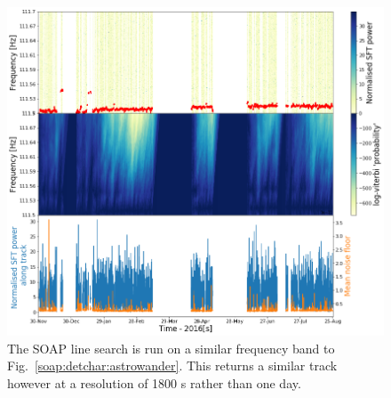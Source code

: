 %
\begin{figure}
	\centering
	\includegraphics[width=\textwidth]{C5_detchar/track_F111_5_111_7_wander_2.png}
	\caption[Example SOAP output for wandering line]{The SOAP line search is run on a similar frequency band to Fig.~\ref{soap:detchar:astrowander}. This returns a similar track however at a resolution of 1800 s rather than one day.}
	\label{detchar:soap:linewander}
\end{figure}
%

